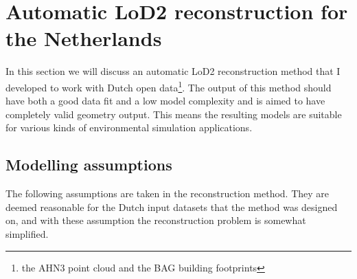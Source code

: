 




\section{Automatic LoD2 reconstruction for the Netherlands}
In this section we will discuss an automatic LoD2 reconstruction method that I developed to work with Dutch open data\footnote{the AHN3 point cloud and the BAG building footprints}. 
The output of this method should have both a good data fit and a low model complexity and is aimed to have completely valid geometry output. 
This means the resulting models are suitable for various kinds of environmental simulation applications.

\subsection{Modelling assumptions}
The following assumptions are taken in the reconstruction method. They are deemed reasonable for the Dutch input datasets that the method was designed on, and with these assumption the reconstruction problem is somewhat simplified.

